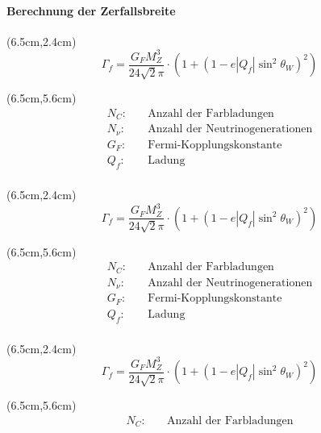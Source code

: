 \begin{iframe}
	\framesubtitle{Berechnung der Zerfallsbreite}
	 {
	\begin{textblock*}{5cm}(6.5cm,2.4cm) %
	\begin{equation*}
		\Gamma_f=\frac{G_F M_Z^3}{24\sqrt{2}\pi}\cdot (1+(1-e|Q_f|\sin^2{\theta_W})^2)
	\end{equation*}
	\end{textblock*}
	\begin{textblock*}{5cm}(6.5cm,5.6cm)
		{\small
		\begin{align*}
			N_C:& \quad \text{Anzahl der Farbladungen}\\
			N_\nu:& \quad \text{Anzahl der Neutrinogenerationen}\\
			G_F:& \quad \text{Fermi-Kopplungskonstante}\\
			Q_f:& \quad \text{Ladung} \\
		\end{align*} }
	\end{textblock*}
	}
	 {
	\begin{textblock*}{5cm}(6.5cm,2.4cm) %
	\begin{equation*}
		\Gamma_f=\frac{G_F M_Z^3}{24\sqrt{2}\pi}\cdot (1+(1-e|Q_f|\sin^2{\theta_W})^2)
	\end{equation*}
	\end{textblock*}
	\begin{textblock*}{5cm}(6.5cm,5.6cm)
		{\small
		\begin{align*}
			N_C:& \quad \text{Anzahl der Farbladungen}\\
			N_\nu:& \quad \text{Anzahl der Neutrinogenerationen}\\
			G_F:& \quad \text{Fermi-Kopplungskonstante}\\
			Q_f:& \quad \text{Ladung} \\
		\end{align*} }
	\end{textblock*}
	}
	 {
	\begin{textblock*}{5cm}(6.5cm,2.4cm) %
	\begin{equation*}
		\Gamma_f=\frac{G_F M_Z^3}{24\sqrt{2}\pi}\cdot (1+(1-e|Q_f|\sin^2{\theta_W})^2)
	\end{equation*}
	\end{textblock*}
	\begin{textblock*}{5cm}(6.5cm,5.6cm)
		{\small
		\begin{align*}
			N_C:& \quad \text{Anzahl der Farbladungen}\\

\end{align*}}
\end{textblock*}}
\end{iframe}
